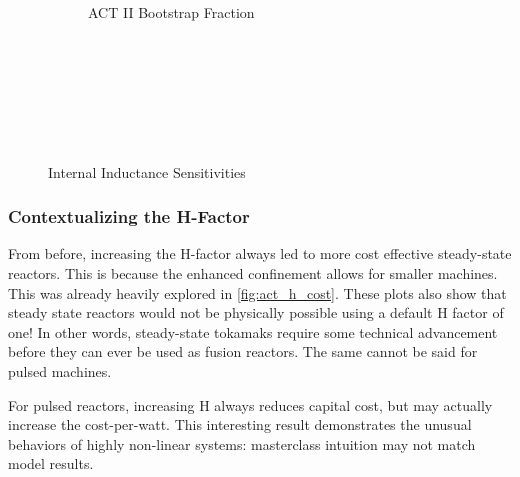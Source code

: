 \begin{figure*}
\begin{subfigure}[t]{0.45\textwidth}
\begin{adjustbox}{width=\textwidth}
			\Large
			
		\end{adjustbox}
        \caption{ACT II Bootstrap Fraction}
    \end{subfigure}
    \hfill \hfill ~\\ ~\\ ~\\ ~\\
    \caption{Internal Inductance Sensitivities} ~ \\
    \label{fig:inductance_sensitivities}
\end{figure*}

\subsubsection{Contextualizing the H-Factor}

From before, increasing the H-factor always led to more cost effective steady-state reactors. This is because the enhanced confinement allows for smaller machines. This was already heavily explored in \cref{fig:act_h_cost}. These plots also show that steady state reactors would not be physically possible using a default H factor of one! In other words, steady-state tokamaks require some technical advancement before they can ever be used as fusion reactors. The same cannot be said for pulsed machines.

For pulsed reactors, increasing H always reduces capital cost, but may actually increase the cost-per-watt.  This interesting result demonstrates the unusual behaviors of highly non-linear systems: masterclass intuition may not match model results.

